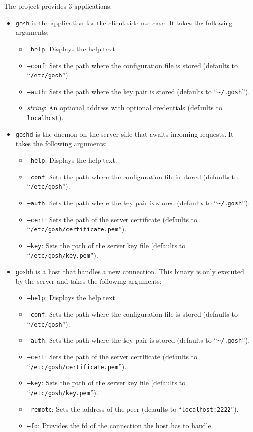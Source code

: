 \documentclass[10pt,a4paper,titlepage,twoside,english,final]{zhawreprt}
\begin{document}
The project provides 3 applications:
\begin{itemize}
\item \texttt{gosh} is the application for the client side use case.
It takes the following arguments:
\begin{itemize}
\item \texttt{--help}: Displays the help text.
\item \texttt{--conf}: Sets the path where the configuration file is stored (defaults to ``\texttt{/etc/gosh}'').
\item \texttt{--auth}: Sets the path where the key pair is stored (defaults to ``\texttt{\textasciitilde{}/.gosh}'').
\item \textit{string}: An optional address with optional credentials (defaults to \texttt{localhost}).
\end{itemize}
\item \texttt{goshd} is the \gls{daemon} on the server side that awaits incoming requests.
It takes the following arguments:
\begin{itemize}
\item \texttt{--help}: Displays the help text.
\item \texttt{--conf}: Sets the path where the configuration file is stored (defaults to ``\texttt{/etc/gosh}'').
\item \texttt{--auth}: Sets the path where the key pair is stored (defaults to ``\texttt{\textasciitilde{}/.gosh}'').
\item \texttt{--cert}: Sets the path of the server certificate (defaults to ``\texttt{/etc/gosh/certifi\linebreak{}cate.pem}'').
\item \texttt{--key}: Sets the path of the server key file (defaults to ``\texttt{/etc/gosh/key.pem}'').
\end{itemize}
\item \texttt{goshh} is a host that handles a new connection.
This binary is only executed by the server and takes the following arguments:
\begin{itemize}
\item \texttt{--help}: Displays the help text.
\item \texttt{--conf}: Sets the path where the configuration file is stored (defaults to ``\texttt{/etc/gosh}'').
\item \texttt{--auth}: Sets the path where the key pair is stored (defaults to ``\texttt{\textasciitilde{}/.gosh}'').
\item \texttt{--cert}: Sets the path of the server certificate (defaults to ``\texttt{/etc/gosh/certifi\linebreak{}cate.pem}'').
\item \texttt{--key}: Sets the path of the server key file (defaults to ``\texttt{/etc/gosh/key.pem}'').
\item \texttt{--remote}: Sets the address of the peer (defaults to ``\texttt{localhost:2222}'').
\item \texttt{--fd}: Provides the \gls{fd} of the connection the host has to handle.
\end{itemize}
\end{itemize}
\end{document}
